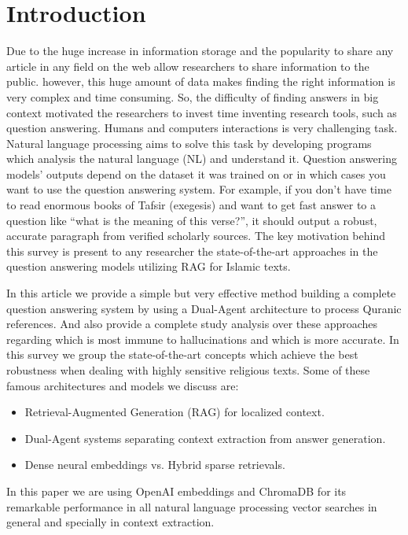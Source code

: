 \documentclass[conference]{IEEEtran}
\begin{document}
\section{Introduction}
Due to the huge increase in information storage and the popularity to share any article in any field on the web allow researchers to share information to the public. however, this huge amount of data makes finding the right information is very complex and time consuming. So, the difficulty of finding answers in big context motivated the researchers to invest time inventing research tools, such as question answering. Humans and computers interactions is very challenging task. Natural language processing aims to solve this task by developing programs which analysis the natural language (NL) and understand it. Question answering models’ outputs depend on the dataset it was trained on or in which cases you want to use the question answering system. For example, if you don’t have time to read enormous books of Tafsir (exegesis) and want to get fast answer to a question like “what is the meaning of this verse?”, it should output a robust, accurate paragraph from verified scholarly sources. The key motivation behind this survey is present to any researcher the state-of-the-art approaches in the question answering models utilizing RAG for Islamic texts. 

In this article we provide a simple but very effective method building a complete question answering system by using a Dual-Agent architecture to process Quranic references. And also provide a complete study analysis over these approaches regarding which is most immune to hallucinations and which is more accurate. In this survey we group the state-of-the-art concepts which achieve the best robustness when dealing with highly sensitive religious texts. Some of these famous architectures and models we discuss are:

\begin{itemize}
\item Retrieval-Augmented Generation (RAG) for localized context.
\item Dual-Agent systems separating context extraction from answer generation.
\item Dense neural embeddings vs. Hybrid sparse retrievals.
\end{itemize}

In this paper we are using OpenAI embeddings and ChromaDB for its remarkable performance in all natural language processing vector searches in general and specially in context extraction.
\end{document}
